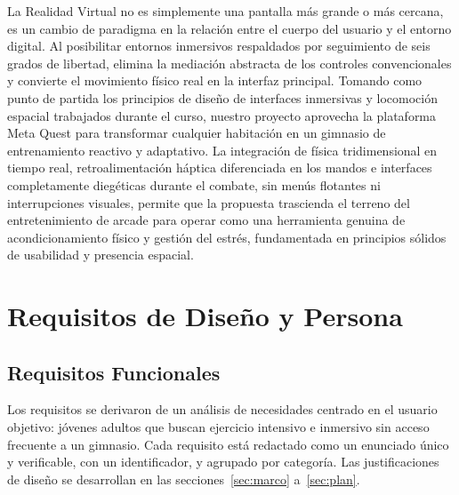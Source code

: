 La Realidad Virtual no es simplemente una pantalla más grande o más cercana, es un cambio de paradigma en la relación entre el cuerpo del usuario y el entorno digital. Al posibilitar entornos inmersivos respaldados por seguimiento de seis grados de libertad, elimina la mediación abstracta de los controles convencionales y convierte el movimiento físico real en la interfaz principal. Tomando como punto de partida los principios de diseño de interfaces inmersivas y locomoción espacial trabajados durante el curso, nuestro proyecto aprovecha la plataforma Meta Quest para transformar cualquier habitación en un gimnasio de entrenamiento reactivo y adaptativo. La integración de física tridimensional en tiempo real, retroalimentación háptica diferenciada en los mandos e interfaces completamente diegéticas durante el combate, sin menús flotantes ni interrupciones visuales, permite que la propuesta trascienda el terreno del entretenimiento de arcade para operar como una herramienta genuina de acondicionamiento físico y gestión del estrés, fundamentada en principios sólidos de usabilidad y presencia espacial.

\section{Requisitos de Diseño y Persona}
\subsection{Requisitos Funcionales}
Los requisitos se derivaron de un análisis de necesidades centrado en el usuario objetivo: jóvenes adultos que buscan ejercicio intensivo e inmersivo sin acceso frecuente a un gimnasio. Cada requisito está redactado como un enunciado único y verificable, con un identificador, y agrupado por categoría. Las justificaciones de diseño se desarrollan en las secciones~\ref{sec:marco} a~\ref{sec:plan}.

